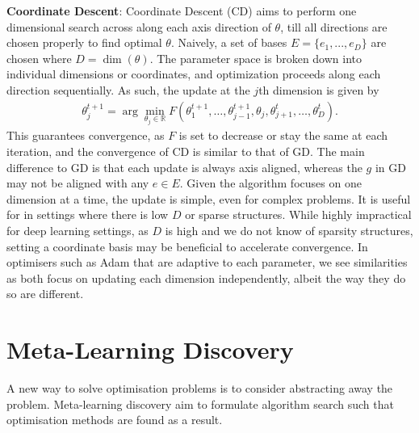 \textbf{Coordinate Descent}: Coordinate Descent (CD) aims to perform one dimensional search across along each axis direction of $\theta$, till all directions are chosen properly to find optimal $\theta$. Naively, a set of bases $E = \{e_1, ..., e_D \}$ are chosen where $D = \dim(\theta)$. The parameter space is broken down into individual dimensions or coordinates, and optimization proceeds along each direction sequentially. As such, the update at the $j$th dimension is given by
\begin{align}
\theta^{t+1}_j = \arg\min_{\theta_j \in \mathbb{R}} F(\theta^{t+1}_1, \dots, \theta^{t+1}_{j-1}, \theta_j, \theta^t_{j+1}, \dots, \theta^t_D).
\end{align}
This guarantees convergence, as $F$ is set to decrease or stay the same at each iteration, and the convergence of CD is similar to that of GD. The main difference to GD is that each update is always axis aligned, whereas the $g$ in GD may not be aligned with any $e \in E$. Given the algorithm focuses on one dimension at a time, the update is simple, even for complex problems. It is useful for in settings where there is low $D$ or sparse structures. While highly impractical for deep learning settings, as $D$ is high and we do not know of sparsity structures, setting a coordinate basis may be beneficial to accelerate convergence. In optimisers such as Adam that are adaptive to each parameter, we see similarities as both focus on updating each dimension independently, albeit the way they do so are different. 


\section{Meta-Learning Discovery}
A new way to solve optimisation problems is to consider abstracting away the problem. Meta-learning discovery aim to formulate algorithm search such that optimisation methods are found as a result.


